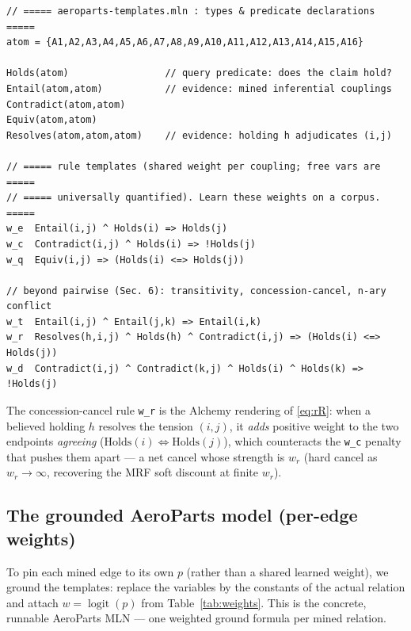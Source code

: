 \documentclass[11pt]{article}
\begin{document}
\begin{lstlisting}[style=mln]
// ===== aeroparts-templates.mln : types & predicate declarations =====
atom = {A1,A2,A3,A4,A5,A6,A7,A8,A9,A10,A11,A12,A13,A14,A15,A16}

Holds(atom)                 // query predicate: does the claim hold?
Entail(atom,atom)           // evidence: mined inferential couplings
Contradict(atom,atom)
Equiv(atom,atom)
Resolves(atom,atom,atom)    // evidence: holding h adjudicates (i,j)

// ===== rule templates (shared weight per coupling; free vars are  =====
// ===== universally quantified). Learn these weights on a corpus.  =====
w_e  Entail(i,j) ^ Holds(i) => Holds(j)
w_c  Contradict(i,j) ^ Holds(i) => !Holds(j)
w_q  Equiv(i,j) => (Holds(i) <=> Holds(j))

// beyond pairwise (Sec. 6): transitivity, concession-cancel, n-ary conflict
w_t  Entail(i,j) ^ Entail(j,k) => Entail(i,k)
w_r  Resolves(h,i,j) ^ Holds(h) ^ Contradict(i,j) => (Holds(i) <=> Holds(j))
w_d  Contradict(i,j) ^ Contradict(k,j) ^ Holds(i) ^ Holds(k) => !Holds(j)
\end{lstlisting}

\noindent The concession-cancel rule \lstinline[style=mln]!w_r! is the Alchemy rendering of
\eqref{eq:rR}: when a believed holding $h$ resolves the tension $(i,j)$, it \emph{adds}
positive weight to the two endpoints \emph{agreeing} ($\mathrm{Holds}(i)\Leftrightarrow
\mathrm{Holds}(j)$), which counteracts the \lstinline[style=mln]!w_c! penalty that pushes
them apart --- a net cancel whose strength is $w_r$ (hard cancel as $w_r\!\to\!\infty$,
recovering the MRF soft discount at finite $w_r$).

\subsection{The grounded AeroParts model (per-edge weights)}
To pin each mined edge to its own $p$ (rather than a shared learned weight), we ground the
templates: replace the variables by the constants of the actual relation and attach
$w=\operatorname{logit}(p)$ from Table~\ref{tab:weights}. This is the concrete, runnable
AeroParts MLN --- one weighted ground formula per mined relation.
\end{document}
